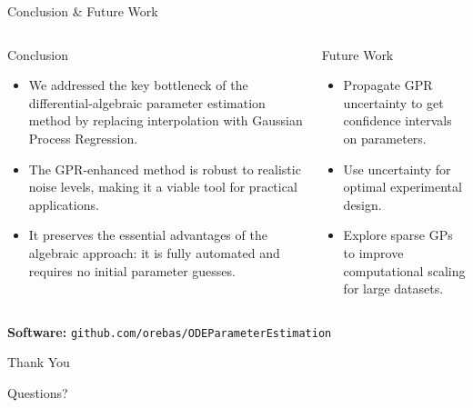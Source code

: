 \documentclass[aspectratio=169]{beamer}
\begin{document}
\begin{frame}{Conclusion \& Future Work}
    \begin{columns}[T]
        \begin{column}{0.55\textwidth}
            \begin{block}{Conclusion}
                \begin{itemize}
                    \item We addressed the key bottleneck of the differential-algebraic parameter estimation method by replacing interpolation with Gaussian Process Regression.
                    \item The GPR-enhanced method is robust to realistic noise levels, making it a viable tool for practical applications.
                    \item It preserves the essential advantages of the algebraic approach: it is fully automated and requires no initial parameter guesses.
                \end{itemize}
            \end{block}
        \end{column}
        \begin{column}{0.4\textwidth}
            \begin{block}{Future Work}
                \begin{itemize}
                    \item Propagate GPR uncertainty to get confidence intervals on parameters.
                    \item Use uncertainty for optimal experimental design.
                    \item Explore sparse GPs to improve computational scaling for large datasets.
                \end{itemize}
            \end{block}
        \end{column}
    \end{columns}
    \vspace{1em}
    \begin{center}
        \small
        \textbf{Software:} \texttt{github.com/orebas/ODEParameterEstimation}
    \end{center}
\end{frame}

\begin{frame}
    \begin{center}
        \huge Thank You
        \vspace{2em}
        
        \Large Questions?
    \end{center}
\end{frame}
\end{document}

